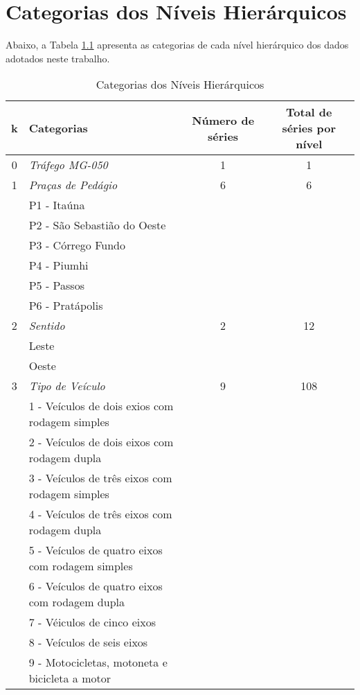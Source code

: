 \documentclass[
	12pt,				%
	openright,			%
	twoside,			%
	a4paper,			%
	english,			%
	french,				%
	spanish,			%
	brazil				%
	]{abntex2}
\begin{document}
\begin{apendicesenv}
\begin{table}[h]
\begin{tabular}{c c c c c}
\bottomrule
\end{tabular}
\end{table}




\chapter{Categorias dos Níveis Hierárquicos}
\label{chap:apendice-categorias}

Abaixo, a Tabela \ref{tab:desc_hierarquiaMG050} apresenta as categorias de cada nível hierárquico dos dados adotados neste trabalho.  

\begin{table}[h]
\ABNTEXfontereduzida\caption{Categorias dos Níveis Hierárquicos}
\label{tab:desc_hierarquiaMG050}
\begin{tabular}{c l c c}

\toprule

k &  Categorias & Número de séries & Total de séries por nível \\
\midrule
0 & \emph{Tráfego MG-050} & 1 & 1 \\
1 & \emph{Praças de Pedágio} & 6 & 6 \\
  & P1 - Itaúna\\
  & P2 - São Sebastião do Oeste\\
  & P3 - Córrego Fundo\\
  & P4 - Piumhi\\
  & P5 - Passos\\
  & P6 - Pratápolis\\
2 & \emph{Sentido} & 2 & 12 \\
 & Leste\\
 & Oeste\\
3 & \emph{Tipo de Veículo} & 9 & 108\\
 & 1 - Veículos de dois exios com rodagem simples\\
 & 2 - Veículos de dois eixos com rodagem dupla\\
 & 3 - Veículos de três eixos com rodagem simples\\
 & 4 - Veículos de três eixos com rodagem dupla\\
 & 5 - Veículos de quatro eixos com rodagem simples\\
 & 6 - Veículos de quatro eixos com rodagem dupla\\
 & 7 - Véiculos de cinco eixos\\
 & 8 - Veículos de seis eixos\\
 & 9 - Motocicletas, motoneta e bicicleta a motor\\
\bottomrule
\end{tabular}
\end{table}


\end{apendicesenv}
\end{document}
